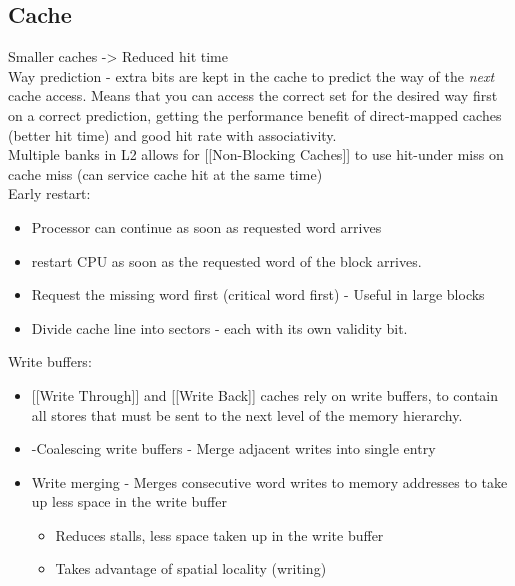 \documentclass[a4paper, 5pt, twocolumn]{article}
\begin{document}
\hypertarget{cache}{%
\subsection{Cache}\label{cache}}

Smaller caches -\textgreater{} Reduced hit time \\

Way prediction - extra bits are kept in the cache to predict the way of
the \emph{next} cache access. Means that you can access the correct set
for the desired way first on a correct prediction, getting the
performance benefit of direct-mapped caches (better hit time) and good
hit rate with associativity. \\

Multiple banks in L2 allows for {[}{[}Non-Blocking Caches{]}{]} to use
hit-under miss on cache miss (can service cache hit at the same time) \\

Early restart:
\begin{itemize}[topsep=0pt,itemsep=-1ex,partopsep=1ex,parsep=1ex]
	\item Processor can continue as soon as requested word arrives 
	\item restart CPU as soon as the requested word of the block arrives. 
	\item Request the missing word first (critical word first) - Useful in large blocks 
	\item Divide cache line into sectors - each with its own validity bit. \\
\end{itemize}

Write buffers:
\begin{itemize}[topsep=0pt,itemsep=-1ex,partopsep=1ex,parsep=1ex]
	\item {[}{[}Write Through{]}{]} and {[}{[}Write Back{]}{]} caches rely on write buffers, to contain all stores that must be sent to the next level of the memory hierarchy. 
	\item -Coalescing write buffers - Merge adjacent writes into single entry
	\item Write merging - Merges consecutive word writes to memory addresses to take up less space in the write buffer 
	\begin{itemize}[topsep=0pt,itemsep=-1ex,partopsep=1ex,parsep=1ex]
		\item Reduces stalls, less space taken up in the write buffer 
		\item Takes advantage of spatial locality (writing) \\
	\end{itemize}
\end{itemize}
\end{document}
